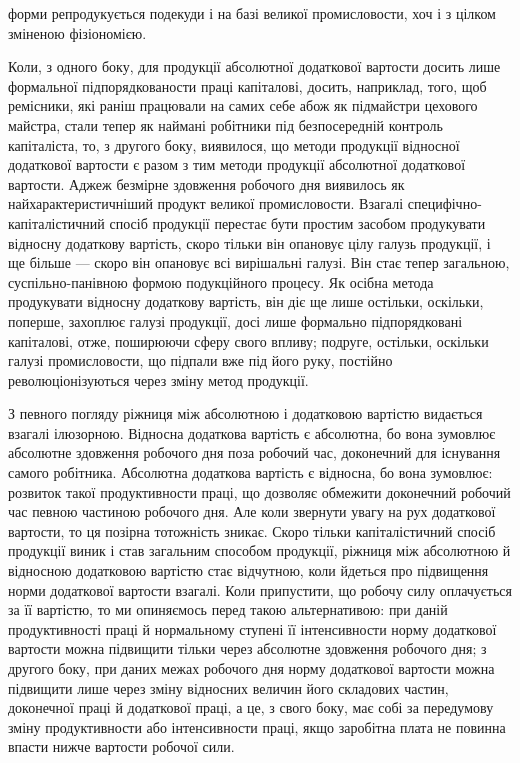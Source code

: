 \parcont{}  %
форми репродукується подекуди і на базі великої промисловости,
хоч і з цілком зміненою фізіономією.

Коли, з одного боку, для продукції абсолютної додаткової
вартости досить лише формальної підпорядкованости праці капіталові,
досить, наприклад, того, щоб ремісники, які раніш працювали
на самих себе абож як підмайстри цехового майстра,
стали тепер як наймані робітники під безпосередній контроль
капіталіста, то, з другого боку, виявилося, що методи продукції
відносної додаткової вартости є разом з тим методи продукції
абсолютної додаткової вартости. Аджеж безмірне здовження
робочого дня виявилось як найхарактеристичніший продукт великої
промисловости. Взагалі специфічно-капіталістичний спосіб
продукції перестає бути простим засобом продукувати відносну
додаткову вартість, скоро тільки він опановує цілу галузь
продукції, і ще більше — скоро він опановує всі вирішальні
галузі. Він стає тепер загальною, суспільно-панівною формою
подукційного процесу. Як осібна метода продукувати відносну
додаткову вартість, він діє ще лише остільки, оскільки, поперше,
захоплює галузі продукції, досі лише формально підпорядковані
капіталові, отже, поширюючи сферу свого впливу; подруге,
остільки, оскільки галузі промисловости, що підпали вже під
його руку, постійно революціонізуються через зміну метод продукції.

З певного погляду ріжниця між абсолютною і додатковою вартістю
видається взагалі ілюзорною. Відносна додаткова вартість
є абсолютна, бо вона зумовлює абсолютне здовження робочого
дня поза робочий час, доконечний для існування самого робітника.
Абсолютна додаткова вартість є відносна, бо вона зумовлює:
розвиток такої продуктивности праці, що дозволяє обмежити
доконечний робочий час певною частиною робочого дня. Але
коли звернути увагу на рух додаткової вартости, то ця позірна
тотожність зникає. Скоро тільки капіталістичний спосіб продукції
виник і став загальним способом продукції, ріжниця між абсолютною
й відносною додатковою вартістю стає відчутною, коли
йдеться про підвищення норми додаткової вартости взагалі.
Коли припустити, що робочу силу оплачується за її вартістю,
то ми опиняємось перед такою альтернативою: при даній продуктивності
праці й нормальному ступені її інтенсивности норму
додаткової вартости можна підвищити тільки через абсолютне
здовження робочого дня; з другого боку, при даних межах робочого
дня норму додаткової вартости можна підвищити лише через
зміну відносних величин його складових частин, доконечної
праці й додаткової праці, а це, з свого боку, має собі за передумову
зміну продуктивности або інтенсивности праці, якщо
заробітна плата не повинна впасти нижче вартости робочої сили.


